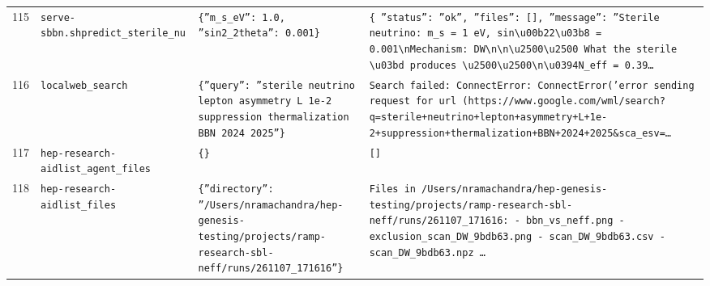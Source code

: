 \documentclass[11pt,a4paper]{article}
\begin{document}
\begin{longtable}{@{}p{}p{}p{}p{}@{}}
115 & \texttt{serve-sbbn.sh}\newline\texttt{predict\_\allowbreak{}sterile\_\allowbreak{}nu} & \texttt{\{''m\_\allowbreak{}s\_\allowbreak{}eV'':\allowbreak{} 1.0,\allowbreak{} ''sin2\_\allowbreak{}2theta'':\allowbreak{} 0.001\}\allowbreak{}} & \texttt{\{   ''status'':\allowbreak{} ''ok'',\allowbreak{}   ''files'':\allowbreak{} []\allowbreak{},\allowbreak{}   ''message'':\allowbreak{} ''Sterile neutrino:\allowbreak{} m\_\allowbreak{}s =\allowbreak{} 1 eV,\allowbreak{} sin\textbackslash{}\allowbreak{}u00b22\textbackslash{}\allowbreak{}u03b8 =\allowbreak{} 0.001\textbackslash{}\allowbreak{}nMechanism:\allowbreak{} DW\textbackslash{}\allowbreak{}n\textbackslash{}\allowbreak{}n\textbackslash{}\allowbreak{}u2500\textbackslash{}\allowbreak{}u2500 What the sterile \textbackslash{}\allowbreak{}u03bd produces \textbackslash{}\allowbreak{}u2500\textbackslash{}\allowbreak{}u2500\textbackslash{}\allowbreak{}n\textbackslash{}\allowbreak{}u0394N\_\allowbreak{}eff =\allowbreak{} 0.39\ldots{}\allowbreak{}} \\
116 & \texttt{local}\newline\texttt{web\_\allowbreak{}search} & \texttt{\{''query'':\allowbreak{} ''sterile neutrino lepton asymmetry L 1e-2 suppression thermalization BBN 2024 2025''\}\allowbreak{}} & \texttt{Search failed:\allowbreak{} ConnectError:\allowbreak{} ConnectError('error sending request for url (https:\allowbreak{}/\allowbreak{}/\allowbreak{}www.google.com/\allowbreak{}wml/\allowbreak{}search?q=\allowbreak{}sterile+neutrino+lepton+asymmetry+L+1e-2+suppression+thermalization+BBN+2024+2025\&sca\_\allowbreak{}esv=\allowbreak{}\ldots{}\allowbreak{}} \\
117 & \texttt{hep-research-aid}\newline\texttt{list\_\allowbreak{}agent\_\allowbreak{}files} & \texttt{\{\}\allowbreak{}} & \texttt{[]\allowbreak{}} \\
118 & \texttt{hep-research-aid}\newline\texttt{list\_\allowbreak{}files} & \texttt{\{''directory'':\allowbreak{} ''/\allowbreak{}Users/\allowbreak{}nramachandra/\allowbreak{}hep-genesis-testing/\allowbreak{}projects/\allowbreak{}ramp-research-sbl-neff/\allowbreak{}runs/\allowbreak{}261107\_\allowbreak{}171616''\}\allowbreak{}} & \texttt{Files in /\allowbreak{}Users/\allowbreak{}nramachandra/\allowbreak{}hep-genesis-testing/\allowbreak{}projects/\allowbreak{}ramp-research-sbl-neff/\allowbreak{}runs/\allowbreak{}261107\_\allowbreak{}171616:\allowbreak{}   - bbn\_\allowbreak{}vs\_\allowbreak{}neff.png   - exclusion\_\allowbreak{}scan\_\allowbreak{}DW\_\allowbreak{}9bdb63.png   - scan\_\allowbreak{}DW\_\allowbreak{}9bdb63.csv   - scan\_\allowbreak{}DW\_\allowbreak{}9bdb63.npz \ldots{}\allowbreak{}} \\

\end{longtable}
\end{document}
